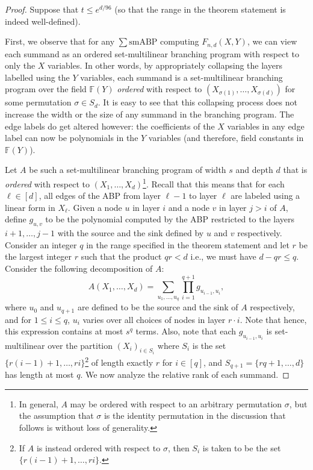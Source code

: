 \documentclass[10pt,a4paper]{article}
\theoremstyle{definition}%
\theoremstyle{plain}
\newcommand{\sbp}{\sum\mathrm{smABP}}
\newcommand{\F}{\mathbb F}
\begin{document}
\begin{proof}
    Suppose that $t\leq e^{d/96}$ (so that the range in the theorem statement is indeed well-defined). 
    
    First, we observe that for any $\sbp$ computing $F_{n,d}(X,Y)$, we can view each summand as an ordered set-multilinear branching program with respect to only the $X$ variables. 
    In other words, by appropriately collapsing the layers labelled using the $Y$ variables, each summand is a set-multilinear branching program over the field $\F(Y)$ \emph{ordered} with respect to $(X_{\sigma(1)},\ldots, X_{\sigma(d)})$ for some permutation $\sigma\in S_d$. 
    It is easy to see that this collapsing process does not increase the width or the size of any summand in the branching program. 
    The edge labels do get altered however: the coefficients of the $X$ variables in any edge label can now be polynomials in the $Y$ variables (and therefore, field constants in $\F(Y)$).

    Let $A$ be such a set-multilinear branching program of width $s$ and depth $d$ that is \emph{ordered} with respect to $(X_1,\ldots, X_d)$\footnote{In general, $A$ may be ordered with respect to an arbitrary permutation $\sigma$, but the assumption that $\sigma$ is the identity permutation in the discussion that follows is without loss of generality.}. 
    Recall that this means that for each $\ell\in[d]$, all edges of the ABP from layer $\ell-1$ to layer $\ell$ are labeled using a linear form {in} $\mathit{X_\ell}$. 
Given a node $u$ in layer $i$ and a node $v$ in layer $j>i$ of $A$, define $g_{u,v}$ to be the polynomial computed by the ABP restricted to the layers $i+1,\ldots,j-1$ with the source and the sink defined by $u$ and $v$ respectively. Consider an integer $q$ in the range specified in the theorem statement and let $r$ be the largest  integer $r$ such that the product $qr< d$ i.e., we must have $d-qr\leq q$. Consider the following decomposition of $A$:
\[
A(X_1,\ldots,X_d) = \sum_{u_1,\ldots, u_{q}} \prod_{i = 1}^{q+1} g_{u_{i-1},u_i},
\]
where $u_0$ and $u_{q+1}$ are defined to be the source and the sink of $A$ respectively, and for $1\leq i \leq q$, $u_i$ varies over all choices of nodes in layer $r\cdot i$. Note that hence, this expression contains at most $s^q$ terms. Also, note that each $g_{u_{i-1},u_i}$ is set-multilinear over the partition $(X_i)_{i\in S_i}$ where $S_i$ is the set $\{r(i-1) + 1, \ldots, ri\}$\footnote{If $A$ is instead ordered with respect to $\sigma$, then $S_i$ is taken to be the set $\{r(i-1) + 1, \ldots, ri\}$.} of length exactly $r$ for $i\in [q]$, and $S_{q+1}=\{rq+1,\ldots,d\}$ has length at most $q$. We now analyze the relative rank of each summand. 


\end{proof}
\end{document}
